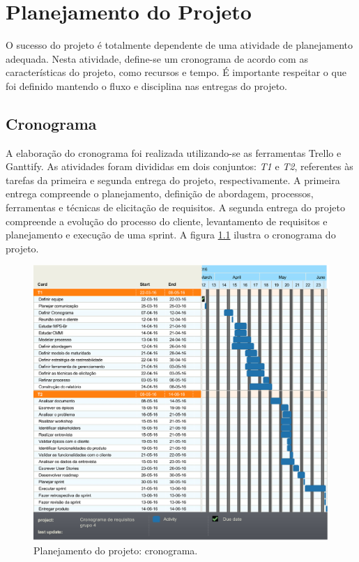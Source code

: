 \chapter[Planejamento do Projeto]{Planejamento do Projeto}

O sucesso do projeto é totalmente dependente de uma atividade de planejamento adequada. Nesta atividade, define-se um cronograma de acordo com as características do projeto, como recursos e tempo. É importante respeitar o que foi definido mantendo o fluxo e disciplina nas entregas do projeto.

\section{Cronograma}

A elaboração do cronograma foi realizada utilizando-se as ferramentas Trello e Ganttify. As atividades foram divididas em dois conjuntos: \textit{T1} e \textit{T2}, referentes às tarefas da primeira e segunda entrega do projeto, respectivamente.
A primeira entrega compreende o planejamento, definição de abordagem, processos, ferramentas e técnicas de elicitação de requisitos.
A segunda entrega do projeto compreende a evolução do processo do cliente, levantamento de requisitos e planejamento e execução de uma sprint. A figura \ref{cronograma} ilustra o cronograma do projeto.

\begin{figure}[!htbp]
	\centering
	\includegraphics[width=\textwidth]{figuras/cronograma}
	\caption{Planejamento do projeto: cronograma.}
	\label{cronograma}
\end{figure}
